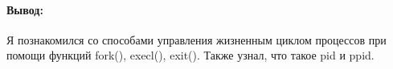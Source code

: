 \paragraph{Вывод:}
Я познакомился со способами управления жизненным циклом процессов при помощи функций fork(), execl(), exit().
Также узнал, что такое pid и ppid.